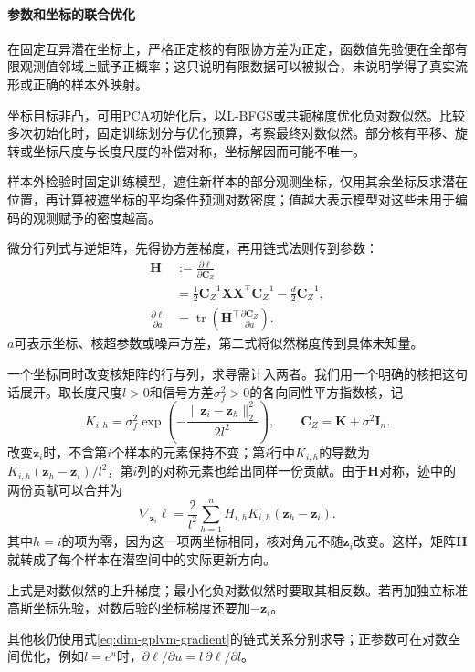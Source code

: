 \paragraph{参数和坐标的联合优化}

在固定互异潜在坐标上，严格正定核的有限协方差为正定，函数值先验便在全部有限观测值邻域上赋予正概率；这只说明有限数据可以被拟合，未说明学得了真实流形或正确的样本外映射。

坐标目标非凸，可用PCA初始化后，以L-BFGS或共轭梯度优化负对数似然。比较多次初始化时，固定训练划分与优化预算，考察最终对数似然。部分核有平移、旋转或坐标尺度与长度尺度的补偿对称，坐标解因而可能不唯一。

样本外检验时固定训练模型，遮住新样本的部分观测坐标，仅用其余坐标反求潜在位置，再计算被遮坐标的平均条件预测对数密度；值越大表示模型对这些未用于编码的观测赋予的密度越高。

微分行列式与逆矩阵，先得协方差梯度，再用链式法则传到参数：
\begin{equation}
\label{eq:dim-gplvm-gradient}
\begin{aligned}
\bm{H}&:=\frac{\partial\ell}{\partial\bm{C}_Z}\\
&=\frac12\bm{C}_Z^{-1}\bm{X}\bm{X}^\top\bm{C}_Z^{-1}
-\frac d2\bm{C}_Z^{-1},\\
\frac{\partial\ell}{\partial a}
&=\operatorname{tr}\left(
\bm{H}^\top\frac{\partial\bm{C}_Z}{\partial a}\right).
\end{aligned}
\end{equation}
$a$可表示坐标、核超参数或噪声方差，第二式将似然梯度传到具体未知量。

一个坐标同时改变核矩阵的行与列，求导需计入两者。我们用一个明确的核把这句话展开。取长度尺度$l>0$和信号方差$\sigma_f^2>0$的各向同性平方指数核，记
\[
 K_{i,h}=\sigma_f^2
 \exp\left(-\frac{\lVert\bm z_i-\bm z_h\rVert_2^2}{2l^2}\right),
 \qquad \bm C_Z=\bm K+\sigma^2\bm I_n.
\]
改变$\bm z_i$时，不含第$i$个样本的元素保持不变；第$i$行中$K_{i,h}$的导数为
$K_{i,h}(\bm z_h-\bm z_i)/l^2$，第$i$列的对称元素也给出同样一份贡献。由于$\bm H$对称，迹中的两份贡献可以合并为
\[
 \nabla_{\bm z_i}\ell
 =\frac{2}{l^2}\sum_{h=1}^n
   H_{i,h}K_{i,h}(\bm z_h-\bm z_i).
\]
其中$h=i$的项为零，因为这一项两坐标相同，核对角元不随$\bm z_i$改变。这样，矩阵$\bm H$就转成了每个样本在潜空间中的实际更新方向。

上式是对数似然的上升梯度；最小化负对数似然时要取其相反数。若再加独立标准高斯坐标先验，对数后验的坐标梯度还要加$-\bm z_i$。

其他核仍使用式\eqref{eq:dim-gplvm-gradient}的链式关系分别求导；正参数可在对数空间优化，例如$l=e^u$时，$\partial\ell/\partial u=l\,\partial\ell/\partial l$。

